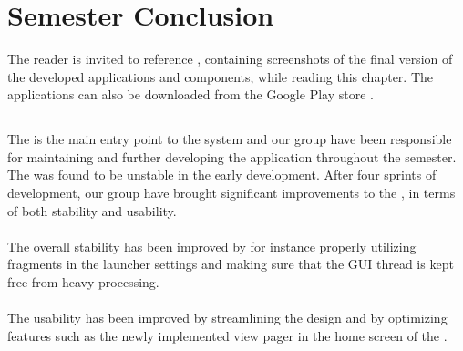 \chapter{Semester Conclusion}
\label{cha:conclusion_final}

The reader is invited to reference , containing screenshots of the final version of the developed applications and components, while reading this chapter. The applications can also be downloaded from the Google Play store \parencite{giraf_google_play}.

\section*{\launcher}
The \launcher is the main entry point to the \giraf system and our group have been responsible for maintaining and further developing the application throughout the semester. The \launcher was found to be unstable in the early development. After four sprints of development, our group have brought significant improvements to the \launcher, in terms of both stability and usability.
\\\\
The overall stability has been improved by for instance properly utilizing fragments in the launcher settings and making sure that the GUI thread is kept free from heavy processing. 
\\\\
The usability has been improved by streamlining the design and by optimizing features such as the newly implemented view pager in the home screen of the \launcher.

